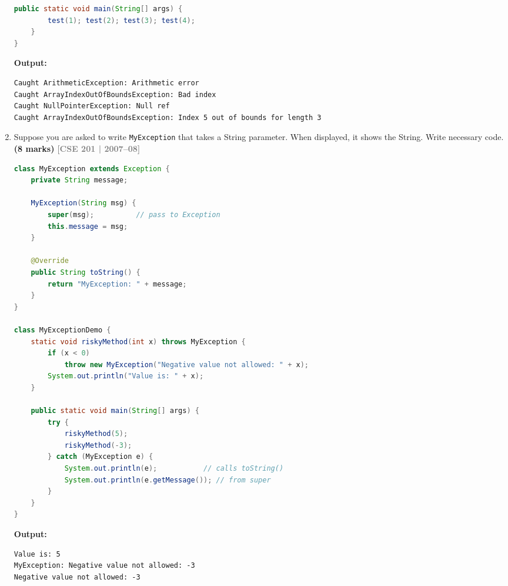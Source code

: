 \documentclass[12pt,a3paper]{article}
\newcommand{\yr}[1]{\hfill\textcolor{gray}{\small\textbf{[#1]}}}
\newcommand{\mk}[1]{\textcolor{orange!70!black}{\small\textbf{(#1 marks)}}}
\begin{document}
\begin{enumerate}
\begin{tcolorbox}[enhanced,breakable,ansbox,
  colback=cE!4,colframe=cE,boxrule=0.8pt,arc=5pt,
  title={\textbf{Answer --- Multiple catch Statements}},
  fonttitle=\bfseries\color{white},colbacktitle=cE]
\begin{lstlisting}[language=Java]
    public static void main(String[] args) {
        test(1); test(2); test(3); test(4);
    }
}
\end{lstlisting}
\textbf{Output:}
\begin{verbatim}
Caught ArithmeticException: Arithmetic error
Caught ArrayIndexOutOfBoundsException: Bad index
Caught NullPointerException: Null ref
Caught ArrayIndexOutOfBoundsException: Index 5 out of bounds for length 3
\end{verbatim}
\end{tcolorbox}



\item Suppose you are asked to write \texttt{MyException} that takes a String parameter. When displayed, it shows the String. Write necessary code. \mk{8}
\yr{CSE 201 | 2007--08}

\begin{tcolorbox}[enhanced,breakable,ansbox,
  colback=cE!4,colframe=cE,boxrule=0.8pt,arc=5pt,
  title={\textbf{Answer --- MyException with String Parameter}},
  fonttitle=\bfseries\color{white},colbacktitle=cE]
\begin{lstlisting}[language=Java]
class MyException extends Exception {
    private String message;

    MyException(String msg) {
        super(msg);          // pass to Exception
        this.message = msg;
    }

    @Override
    public String toString() {
        return "MyException: " + message;
    }
}

class MyExceptionDemo {
    static void riskyMethod(int x) throws MyException {
        if (x < 0)
            throw new MyException("Negative value not allowed: " + x);
        System.out.println("Value is: " + x);
    }

    public static void main(String[] args) {
        try {
            riskyMethod(5);
            riskyMethod(-3);
        } catch (MyException e) {
            System.out.println(e);           // calls toString()
            System.out.println(e.getMessage()); // from super
        }
    }
}
\end{lstlisting}
\textbf{Output:}
\begin{verbatim}
Value is: 5
MyException: Negative value not allowed: -3
Negative value not allowed: -3
\end{verbatim}
\end{tcolorbox}




\end{enumerate}
\newpage
\end{document}
